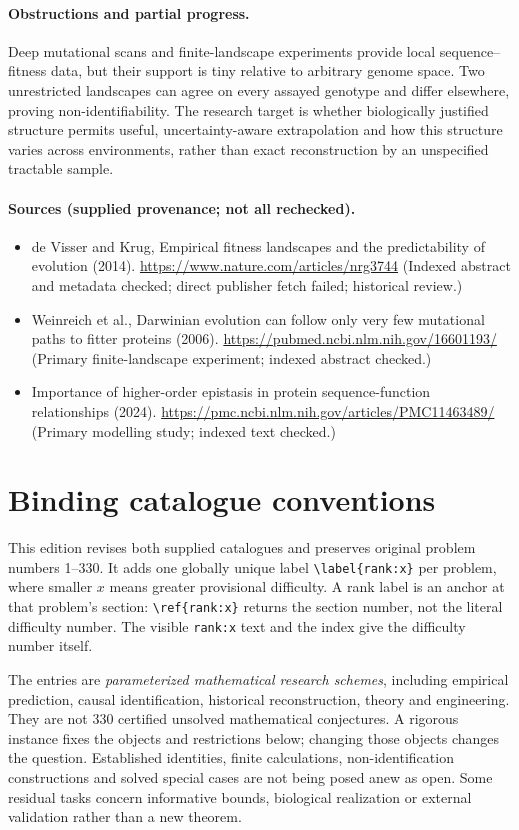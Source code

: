 \documentclass[11pt]{article}
\begin{document}
\paragraph{Obstructions and partial progress.} Deep mutational scans and finite-landscape experiments provide local sequence--fitness data, but their support is tiny relative to arbitrary genome space. Two unrestricted landscapes can agree on every assayed genotype and differ elsewhere, proving non-identifiability. The research target is whether biologically justified structure permits useful, uncertainty-aware extrapolation and how this structure varies across environments, rather than exact reconstruction by an unspecified tractable sample.
\paragraph{Sources (supplied provenance; not all rechecked).} \begin{itemize}
\item de Visser and Krug, Empirical fitness landscapes and the predictability of evolution (2014). \url{https://www.nature.com/articles/nrg3744} (Indexed abstract and metadata checked; direct publisher fetch failed; historical review.)
\item Weinreich et al., Darwinian evolution can follow only very few mutational paths to fitter proteins (2006). \url{https://pubmed.ncbi.nlm.nih.gov/16601193/} (Primary finite-landscape experiment; indexed abstract checked.)
\item Importance of higher-order epistasis in protein sequence-function relationships (2024). \url{https://pmc.ncbi.nlm.nih.gov/articles/PMC11463489/} (Primary modelling study; indexed text checked.)
\end{itemize}


\section*{Binding catalogue conventions}
This edition revises both supplied catalogues and preserves original problem numbers 1--330. It adds one globally unique label \verb|\label{rank:x}| per problem, where smaller $x$ means greater provisional difficulty. A rank label is an anchor at that problem's section: \verb|\ref{rank:x}| returns the section number, not the literal difficulty number. The visible \texttt{rank:x} text and the index give the difficulty number itself.

The entries are \emph{parameterized mathematical research schemes}, including empirical prediction, causal identification, historical reconstruction, theory and engineering. They are not 330 certified unsolved mathematical conjectures. A rigorous instance fixes the objects and restrictions below; changing those objects changes the question. Established identities, finite calculations, non-identification constructions and solved special cases are not being posed anew as open. Some residual tasks concern informative bounds, biological realization or external validation rather than a new theorem.
\end{document}
